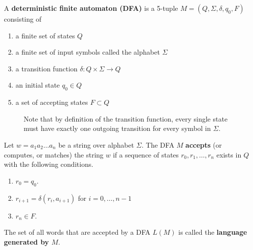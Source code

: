   \begin{definition}
    A \textbf{deterministic finite automaton (DFA)} is a 5-tuple $M = (Q, \Sigma, \delta, q_0, F)$ consisting of 
    \begin{enumerate}
      \item a finite set of states $Q$
      \item a finite set of input symbols called the alphabet $\Sigma$
      \item a transition function $\delta: Q \times \Sigma \to Q$
      \item an initial state $q_0 \in Q$ 
      \item a set of accepting states $F \subset Q$
    \end{enumerate}

    \begin{figure}[H]
      \centering 
      \caption{Note that by definition of the transition function, every single state must have exactly one outgoing transition for every symbol in $\Sigma$.} 
      \label{fig:dfa}
    \end{figure}
  \end{definition}

  \begin{definition}
    Let $w = a_1 a_2 \ldots a_n$ be a string over alphabet $\Sigma$. The DFA $M$ \textbf{accepts} (or computes, or matches) the string $w$ if a sequence of states $r_0, r_1, \ldots, r_n$ exists in $Q$ with the following conditions. 
    \begin{enumerate}
      \item $r_0 = q_0$. 
      \item $r_{i+1} = \delta(r_i, a_{i+1})$ for $i = 0, \ldots, n-1$ 
      \item $r_n \in F$. 
    \end{enumerate}
    The set of all words that are accepted by a DFA $L(M)$ is called the \textbf{language generated by $M$}. 
  \end{definition}

